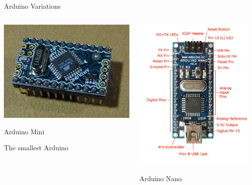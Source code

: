 \documentclass{beamer}
\begin{document}
\begin{frame}{Arduino Variations}
  \begin{columns}
    \begin{column}{0.5\textwidth}
      \pause
      \centerline{\includegraphics[width=.95\textwidth]{arduino_mini.jpg}}
      \centerline{Arduino Mini}
      \centerline{The smallest Arduino}
    \end{column}
    \begin{column}{0.5\textwidth}
      \pause
      \centerline{\includegraphics[width=.95\textwidth]{NanoFront.jpg}}
      \centerline{Arduino Nano}
    \end{column}
  \end{columns}
\end{frame}
\end{document}
